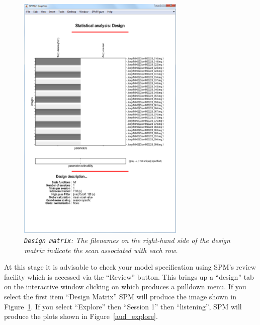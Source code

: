 \begin{figure}
\begin{center}
\includegraphics[width=80mm]{auditory/design}
\caption{\emph{\texttt{Design matrix}: The filenames on the right-hand side of the design matrix indicate the scan associated with each row.\label{aud_design}}}
\end{center}
\end{figure}

At this stage it is advisable to check your model specification using SPM's review facility which is accessed via the ``Review'' button. This brings up a ``design'' tab on the interactive window clicking on which produces a pulldown menu. If you select the first item ``Design Matrix'' SPM will produce the image shown in Figure~\ref{aud_design}. If you select ``Explore'' then ``Session 1'' then ``listening'', SPM will produce the plots shown in Figure~\ref{aud_explore}.


